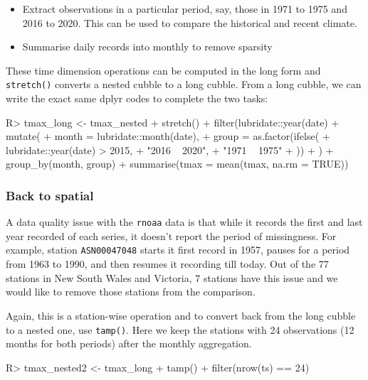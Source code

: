 \documentclass[
]{jss}
\providecommand{\tightlist}{%
  \setlength{\itemsep}{0pt}\setlength{\parskip}{0pt}}
\begin{document}
\begin{itemize}
\tightlist
\item
  Extract observations in a particular period, say, those in 1971 to
  1975 and 2016 to 2020. This can be used to compare the historical and
  recent climate.
\item
  Summarise daily records into monthly to remove sparsity
\end{itemize}

These time dimension operations can be computed in the long form and
\texttt{stretch()} converts a nested cubble to a long cubble. From a
long cubble, we can write the exact same dplyr codes to complete the two
tasks:

\begin{CodeChunk}
\begin{CodeInput}
R> tmax_long <- tmax_nested %
+   stretch() %
+   filter(lubridate::year(date) %
+   mutate(
+     month = lubridate::month(date),
+     group = as.factor(ifelse(
+       lubridate::year(date) > 2015,
+       "2016 ~ 2020",
+       "1971 ~ 1975"
+     ))
+   ) %
+   group_by(month, group) %
+   summarise(tmax = mean(tmax, na.rm = TRUE))
\end{CodeInput}
\end{CodeChunk}

\hypertarget{back-to-spatial}{%
\subsubsection{Back to spatial}\label{back-to-spatial}}

A data quality issue with the \texttt{rnoaa} data is that while it
records the first and last year recorded of each series, it doesn't
report the period of missingness. For example, station
\texttt{ASN00047048} starts it first record in 1957, pauses for a period
from 1963 to 1990, and then resumes it recording till today. Out of the
77 stations in New South Wales and Victoria, 7 stations have this issue
and we would like to remove those stations from the comparison.

Again, this is a station-wise operation and to convert back from the
long cubble to a nested one, use \texttt{tamp()}. Here we keep the
stations with 24 observations (12 months for both periods) after the
monthly aggregation.

\begin{CodeChunk}
\begin{CodeInput}
R> tmax_nested2 <- tmax_long %
+   tamp() %
+   filter(nrow(ts) == 24)
\end{CodeInput}
\end{CodeChunk}
\end{document}
